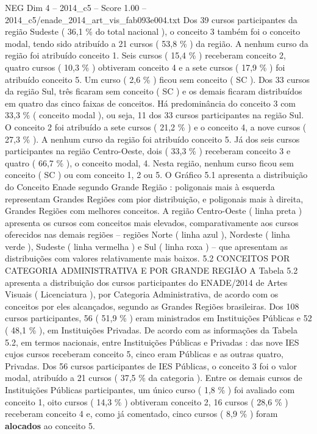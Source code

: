 \begin{textsample}{NEG Dim 4 – 2014\_c5 – Score 1.00 – 2014\_c5/enade\_2014\_art\_vis\_fab093e004.txt}
Dos 39 cursos participantes da região Sudeste ( 36,1 \% do total nacional ), o conceito 3 também foi o conceito modal, tendo sido atribuído a 21 cursos ( 53,8 \% ) da região.
A nenhum curso da região foi atribuído conceito 1.
Seis cursos ( 15,4 \% ) receberam conceito 2, quatro cursos ( 10,3 \% ) obtiveram conceito 4 e a sete cursos ( 17,9 \% ) foi atribuído conceito 5.
Um curso ( 2,6 \% ) ficou sem conceito ( SC ).
Dos 33 cursos da região Sul, três ficaram sem conceito ( SC ) e os demais ficaram distribuídos em quatro das cinco faixas de conceitos.
Há predominância do conceito 3 com 33,3 \% ( conceito modal ), ou seja, 11 dos 33 cursos participantes na região Sul.
O conceito 2 foi atribuído a sete cursos ( 21,2 \% ) e o conceito 4, a nove cursos ( 27,3 \% ).
A nenhum curso da região foi atribuído conceito 5.
Já dos seis cursos participantes na região Centro-Oeste, dois ( 33,3 \% ) receberam conceito 3 e quatro ( 66,7 \% ), o conceito modal, 4.
Nesta região, nenhum curso ficou sem conceito ( SC ) ou com conceito 1, 2 ou 5.
O Gráfico 5.1 apresenta a distribuição do Conceito Enade segundo Grande Região : poligonais mais à esquerda representam Grandes Regiões com pior distribuição, e poligonais mais à direita, Grandes Regiões com melhores conceitos.
A região Centro-Oeste ( linha preta ) apresenta os cursos com conceitos mais elevados, comparativamente aos cursos oferecidos nas demais regiões – regiões Norte ( linha azul ), Nordeste ( linha verde ), Sudeste ( linha vermelha ) e Sul ( linha roxa ) – que apresentam as distribuições com valores relativamente mais baixos. 5.2 CONCEITOS POR CATEGORIA ADMINISTRATIVA E POR GRANDE REGIÃO A Tabela 5.2 apresenta a distribuição dos cursos participantes do ENADE/2014 de Artes Visuais ( Licenciatura ), por Categoria Administrativa, de acordo com os conceitos por eles alcançados, segundo as Grandes Regiões brasileiras.
Dos 108 cursos participantes, 56 ( 51,9 \% ) eram ministrados em Instituições Públicas e 52 ( 48,1 \% ), em Instituições Privadas.
De acordo com as informações da Tabela 5.2, em termos nacionais, entre Instituições Públicas e Privadas : das nove IES cujos cursos receberam conceito 5, cinco eram Públicas e as outras quatro, Privadas.
Dos 56 cursos participantes de IES Públicas, o conceito 3 foi o valor modal, atribuído a 21 cursos ( 37,5 \% da categoria ).
Entre os demais cursos de Instituições Públicas participantes, um único curso ( 1,8 \% ) foi avaliado com conceito 1, oito cursos ( 14,3 \% ) obtiveram conceito 2, 16 cursos ( 28,6 \% ) receberam conceito 4 e, como já comentado, cinco cursos ( 8,9 \% ) foram \textbf{alocados} ao conceito 5.

\end{textsample}
